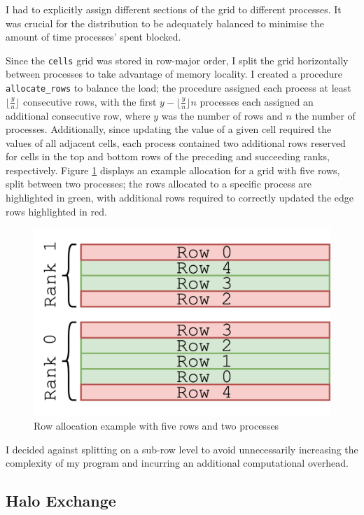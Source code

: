 \documentclass[twocolumn, a4paper]{article}
\begin{document}
I had to explicitly assign different sections of the grid to different processes.
It was crucial for the distribution to be adequately balanced to minimise the amount of time processes' spent blocked.

Since the \texttt{cells} grid was stored in row-major order, I split the grid horizontally between processes to take advantage of memory locality.
I created a procedure \texttt{allocate\_rows} to balance the load; the procedure assigned each process at least $\lfloor\frac{y}{n}\rfloor$ consecutive rows, with the first $y - \lfloor\frac{y}{n}\rfloor n$ processes each assigned an additional consecutive row, where $y$ was the number of rows and $n$ the number of processes.
Additionally, since updating the value of a given cell required the values of all adjacent cells, each process contained two additional rows reserved for cells in the top and bottom rows of the preceding and succeeding ranks, respectively.
Figure \ref{fig:rows} displays an example allocation for a grid with five rows, split between two processes; the rows allocated to a specific process are highlighted in green, with additional rows required to correctly updated the edge rows highlighted in red.

\begin{figure}[htbp]
  \centering
  \includegraphics[width=.75\linewidth]{rows.png}
  \caption{Row allocation example with five rows and two processes}\label{fig:rows}
\end{figure}

I decided against splitting on a sub-row level to avoid unnecessarily increasing the complexity of my program and incurring an additional computational overhead.

\subsection{Halo Exchange}
\end{document}
